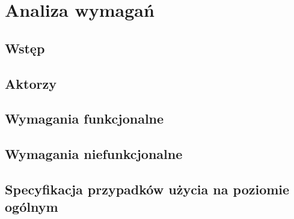 \chapter{Analiza wymagań}

\section{Wstęp} 

\section{Aktorzy}

\section{Wymagania funkcjonalne}


\section{Wymagania niefunkcjonalne}

\section{Specyfikacja przypadków użycia na poziomie ogólnym}